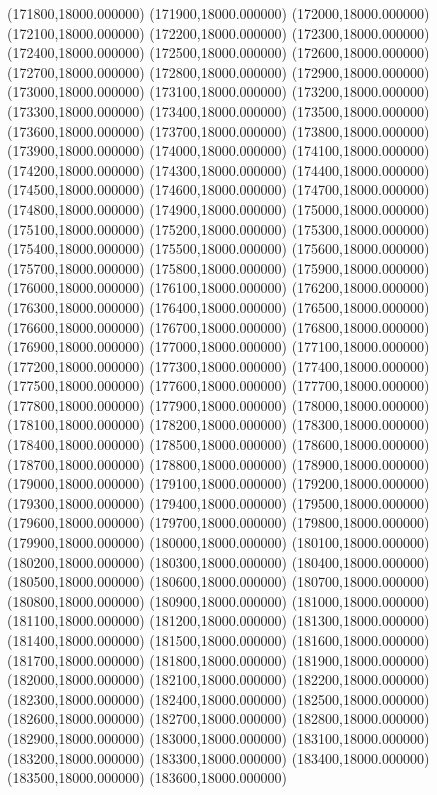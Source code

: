 (171800,18000.000000)
(171900,18000.000000)
(172000,18000.000000)
(172100,18000.000000)
(172200,18000.000000)
(172300,18000.000000)
(172400,18000.000000)
(172500,18000.000000)
(172600,18000.000000)
(172700,18000.000000)
(172800,18000.000000)
(172900,18000.000000)
(173000,18000.000000)
(173100,18000.000000)
(173200,18000.000000)
(173300,18000.000000)
(173400,18000.000000)
(173500,18000.000000)
(173600,18000.000000)
(173700,18000.000000)
(173800,18000.000000)
(173900,18000.000000)
(174000,18000.000000)
(174100,18000.000000)
(174200,18000.000000)
(174300,18000.000000)
(174400,18000.000000)
(174500,18000.000000)
(174600,18000.000000)
(174700,18000.000000)
(174800,18000.000000)
(174900,18000.000000)
(175000,18000.000000)
(175100,18000.000000)
(175200,18000.000000)
(175300,18000.000000)
(175400,18000.000000)
(175500,18000.000000)
(175600,18000.000000)
(175700,18000.000000)
(175800,18000.000000)
(175900,18000.000000)
(176000,18000.000000)
(176100,18000.000000)
(176200,18000.000000)
(176300,18000.000000)
(176400,18000.000000)
(176500,18000.000000)
(176600,18000.000000)
(176700,18000.000000)
(176800,18000.000000)
(176900,18000.000000)
(177000,18000.000000)
(177100,18000.000000)
(177200,18000.000000)
(177300,18000.000000)
(177400,18000.000000)
(177500,18000.000000)
(177600,18000.000000)
(177700,18000.000000)
(177800,18000.000000)
(177900,18000.000000)
(178000,18000.000000)
(178100,18000.000000)
(178200,18000.000000)
(178300,18000.000000)
(178400,18000.000000)
(178500,18000.000000)
(178600,18000.000000)
(178700,18000.000000)
(178800,18000.000000)
(178900,18000.000000)
(179000,18000.000000)
(179100,18000.000000)
(179200,18000.000000)
(179300,18000.000000)
(179400,18000.000000)
(179500,18000.000000)
(179600,18000.000000)
(179700,18000.000000)
(179800,18000.000000)
(179900,18000.000000)
(180000,18000.000000)
(180100,18000.000000)
(180200,18000.000000)
(180300,18000.000000)
(180400,18000.000000)
(180500,18000.000000)
(180600,18000.000000)
(180700,18000.000000)
(180800,18000.000000)
(180900,18000.000000)
(181000,18000.000000)
(181100,18000.000000)
(181200,18000.000000)
(181300,18000.000000)
(181400,18000.000000)
(181500,18000.000000)
(181600,18000.000000)
(181700,18000.000000)
(181800,18000.000000)
(181900,18000.000000)
(182000,18000.000000)
(182100,18000.000000)
(182200,18000.000000)
(182300,18000.000000)
(182400,18000.000000)
(182500,18000.000000)
(182600,18000.000000)
(182700,18000.000000)
(182800,18000.000000)
(182900,18000.000000)
(183000,18000.000000)
(183100,18000.000000)
(183200,18000.000000)
(183300,18000.000000)
(183400,18000.000000)
(183500,18000.000000)
(183600,18000.000000)
